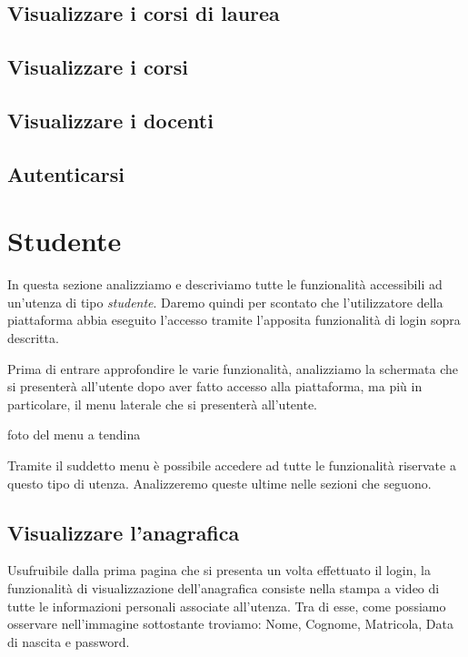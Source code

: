 \documentclass [a4paper,11pt]{book}
\begin{document}
\subsection{Visualizzare i corsi di laurea}

\medskip

\subsection{Visualizzare i corsi}

\medskip

\subsection{Visualizzare i docenti}

\medskip

\subsection{Autenticarsi}

\medskip
\medskip

\section{Studente}

In questa sezione analizziamo e descriviamo tutte le funzionalità accessibili ad un'utenza di tipo \emph{studente}. Daremo quindi per scontato che l'utilizzatore della piattaforma abbia eseguito l'accesso tramite l'apposita funzionalità di login sopra descritta.

Prima di entrare approfondire le varie funzionalità, analizziamo la schermata che si presenterà all'utente dopo aver fatto accesso alla piattaforma, ma più in particolare, il menu laterale che si presenterà all'utente.

foto del menu a tendina

Tramite il suddetto menu è possibile accedere ad tutte le funzionalità riservate a questo tipo di utenza. Analizzeremo queste ultime nelle sezioni che seguono.


\subsection{Visualizzare l'anagrafica}

Usufruibile dalla prima pagina che si presenta un volta effettuato il login, la funzionalità di visualizzazione dell'anagrafica consiste nella stampa a video di tutte le informazioni personali associate all'utenza. Tra di esse, come possiamo osservare nell'immagine sottostante troviamo: Nome, Cognome, Matricola, Data di nascita e password.
\end{document}
